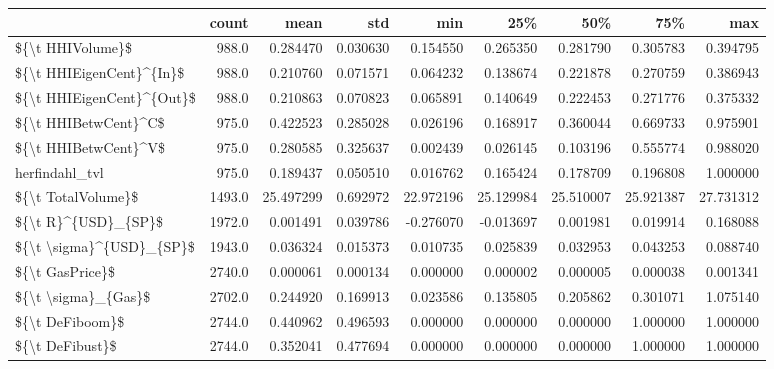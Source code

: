 \begin{tabular}{lrrrrrrrr}
\toprule
{} &   count &       mean &       std &        min &        25\% &        50\% &        75\% &        max \\
\midrule
\$\{\textbackslash t HHIVolume\}\$          &   988.0 &   0.284470 &  0.030630 &   0.154550 &   0.265350 &   0.281790 &   0.305783 &   0.394795 \\
\$\{\textbackslash t HHIEigenCent\}\textasciicircum \{In\}\$  &   988.0 &   0.210760 &  0.071571 &   0.064232 &   0.138674 &   0.221878 &   0.270759 &   0.386943 \\
\$\{\textbackslash t HHIEigenCent\}\textasciicircum \{Out\}\$ &   988.0 &   0.210863 &  0.070823 &   0.065891 &   0.140649 &   0.222453 &   0.271776 &   0.375332 \\
\$\{\textbackslash t HHIBetwCent\}\textasciicircum C\$      &   975.0 &   0.422523 &  0.285028 &   0.026196 &   0.168917 &   0.360044 &   0.669733 &   0.975901 \\
\$\{\textbackslash t HHIBetwCent\}\textasciicircum V\$      &   975.0 &   0.280585 &  0.325637 &   0.002439 &   0.026145 &   0.103196 &   0.555774 &   0.988020 \\
herfindahl\_tvl            &   975.0 &   0.189437 &  0.050510 &   0.016762 &   0.165424 &   0.178709 &   0.196808 &   1.000000 \\
\$\{\textbackslash t TotalVolume\}\$        &  1493.0 &  25.497299 &  0.692972 &  22.972196 &  25.129984 &  25.510007 &  25.921387 &  27.731312 \\
\$\{\textbackslash t R\}\textasciicircum \{USD\}\_\{SP\}\$       &  1972.0 &   0.001491 &  0.039786 &  -0.276070 &  -0.013697 &   0.001981 &   0.019914 &   0.168088 \\
\$\{\textbackslash t \textbackslash sigma\}\textasciicircum \{USD\}\_\{SP\}\$  &  1943.0 &   0.036324 &  0.015373 &   0.010735 &   0.025839 &   0.032953 &   0.043253 &   0.088740 \\
\$\{\textbackslash t GasPrice\}\$           &  2740.0 &   0.000061 &  0.000134 &   0.000000 &   0.000002 &   0.000005 &   0.000038 &   0.001341 \\
\$\{\textbackslash t \textbackslash sigma\}\_\{Gas\}\$       &  2702.0 &   0.244920 &  0.169913 &   0.023586 &   0.135805 &   0.205862 &   0.301071 &   1.075140 \\
\$\{\textbackslash t DeFiboom\}\$           &  2744.0 &   0.440962 &  0.496593 &   0.000000 &   0.000000 &   0.000000 &   1.000000 &   1.000000 \\
\$\{\textbackslash t DeFibust\}\$           &  2744.0 &   0.352041 &  0.477694 &   0.000000 &   0.000000 &   0.000000 &   1.000000 &   1.000000 \\
\bottomrule
\end{tabular}

